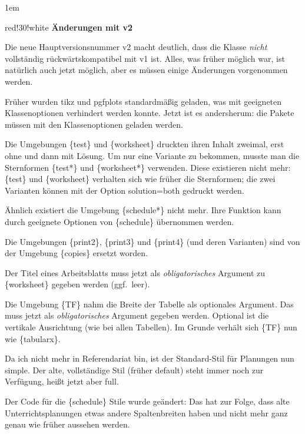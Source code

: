 \documentclass[hyperworksheet,pgfplots]{drcschool}
\newcommand*{\pkg}[1]{\textup{\ttfamily#1}}                                %
\newcommand*{\opt}[1]{\textup{\ttfamily#1}}                                %
\newcommand*{\env}[1]{\textup{\ttfamily\{#1\}}}                            %
\begin{document}
\begin{center}%
\fboxsep1em
\begin{colorminipage}{red!30!white}{\linewidth}
\textbf{Änderungen mit \opt{v2}}\par\smallskip\noindent
Die neue Hauptversionsnummer \opt{v2} macht deutlich, dass die Klasse
\emph{nicht} vollständig rückwärtskompatibel mit \opt{v1} ist. Alles,
was früher möglich war, ist natürlich auch jetzt möglich, aber es müssen
einige Änderungen vorgenommen werden.
\begin{compactitem}
\item Früher wurden \pkg{tikz} und \pkg{pgfplots} standardmäßig geladen, was mit
geeigneten Klassenoptionen verhindert werden konnte. Jetzt ist es andersherum:
die Pakete müssen mit den Klassenoptionen geladen werden.
\item Die Umgebungen \env{test} und \env{worksheet} druckten ihren Inhalt zweimal,
erst ohne und dann mit Lösung. Um nur eine Variante zu bekommen, musste man die
Sternformen \env{test*} und \env{worksheet*} verwenden. Diese existieren nicht mehr:
\env{test} und \env{worksheet} verhalten sich wie früher die Sternformen; die
zwei Varianten können mit der Option \opt{solution=both} gedruckt werden.
\item Ähnlich existiert die Umgebung \env{schedule*} nicht mehr. Ihre Funktion
kann durch geeignete Optionen von \env{schedule} übernommen werden.
\item Die Umgebungen \env{print2}, \env{print3} und \env{print4} (und deren Varianten)
sind von der Umgebung \env{copies} ersetzt worden.
\item Der Titel eines Arbeitsblatts muss jetzt als \emph{obligatorisches}
Argument zu \env{worksheet} gegeben werden (ggf.~leer).
\item Die Umgebung \env{TF} nahm die Breite der Tabelle als optionales Argument.
Das muss jetzt als \emph{obligatorisches} Argument gegeben werden. Optional
ist die vertikale Ausrichtung (wie bei allen Tabellen). Im Grunde verhält sich
\env{TF} nun wie \env{tabularx}.
\item Da ich nicht mehr in Referendariat bin, ist der Standard-Stil für Planungen
nun \opt{simple}. Der alte, vollständige Stil (früher \opt{default}) steht immer
noch zur Verfügung, heißt jetzt aber \opt{full}.
\item Der Code für die \env{schedule} Stile wurde geändert: Das hat zur Folge,
dass alte Unterrichtsplanungen etwas andere Spaltenbreiten haben und
nicht mehr ganz genau wie früher aussehen werden.
\end{compactitem}
\end{colorminipage}
\end{center}
\end{document}
